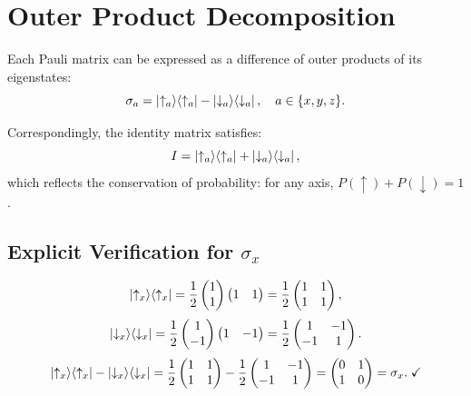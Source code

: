 \documentclass[11pt,a4paper]{article}
\theoremstyle{definition}
\theoremstyle{plain}
\theoremstyle{remark}
\begin{document}
\section{Outer Product Decomposition}

Each Pauli matrix can be expressed as a difference of outer products of its eigenstates:
\[
    \sigma_a = \ket{\uparrow_a}\!\bra{\uparrow_a} - \ket{\downarrow_a}\!\bra{\downarrow_a}, \quad a \in \{x,y,z\}.
\]

Correspondingly, the identity matrix satisfies:
\[
    I = \ket{\uparrow_a}\!\bra{\uparrow_a} + \ket{\downarrow_a}\!\bra{\downarrow_a},
\]
which reflects the conservation of probability: for any axis, $P(\uparrow) + P(\downarrow) = 1$.

\subsection{Explicit Verification for $\sigma_x$}

\[
    \ket{\uparrow_x}\!\bra{\uparrow_x} = \frac{1}{2}\begin{pmatrix}1\\1\end{pmatrix}\begin{pmatrix}1&1\end{pmatrix} = \frac{1}{2}\begin{pmatrix}1&1\\1&1\end{pmatrix},
\]
\[
    \ket{\downarrow_x}\!\bra{\downarrow_x} = \frac{1}{2}\begin{pmatrix}1\\-1\end{pmatrix}\begin{pmatrix}1&-1\end{pmatrix} = \frac{1}{2}\begin{pmatrix}1&-1\\-1&1\end{pmatrix}.
\]
\[
    \ket{\uparrow_x}\!\bra{\uparrow_x} - \ket{\downarrow_x}\!\bra{\downarrow_x} = \frac{1}{2}\begin{pmatrix}1&1\\1&1\end{pmatrix} - \frac{1}{2}\begin{pmatrix}1&-1\\-1&1\end{pmatrix} = \begin{pmatrix}0&1\\1&0\end{pmatrix} = \sigma_x. \;\checkmark
\]
\end{document}
